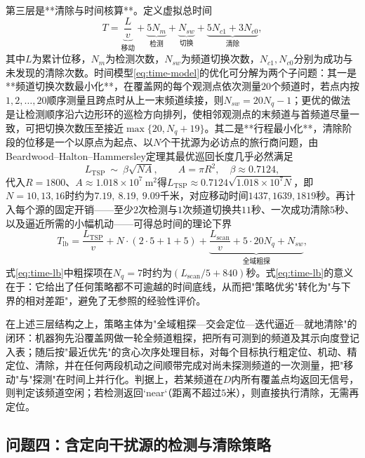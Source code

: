 \documentclass[12pt,a4paper]{ctexart}
\begin{document}
第三层是**清除与时间核算**。定义虚拟总时间
\begin{equation}
T=\underbrace{\frac{L}{v}}_{\text{移动}}+\underbrace{5N_m}_{\text{检测}}+\underbrace{N_{sw}}_{\text{切换}}+\underbrace{5N_{c1}+3N_{c0}}_{\text{清除}},
\label{eq:time-model}
\end{equation}
其中$L$为累计位移，$N_m$为检测次数，$N_{sw}$为频道切换次数，$N_{c1},N_{c0}$分别为成功与未发现的清除次数。时间模型\eqref{eq:time-model}的优化可分解为两个子问题：其一是**频道切换次数最小化**，在覆盖网的每个观测点依次测量$20$个频道时，若点内按$1,2,\dots,20$顺序测量且跨点时从上一末频道续接，则$N_{sw}=20N_q-1$；更优的做法是让检测顺序沿六边形环的巡检方向排列，使相邻观测点的末频道与首频道尽量一致，可把切换次数压至接近$\max\{20,N_q+19\}$。其二是**行程最小化**，清除阶段的位移是一个以原点为起点、以$N$个干扰源为必访点的旅行商问题，由Beardwood--Halton--Hammersley定理其最优巡回长度几乎必然满足
\begin{equation}
L_{\mathrm{TSP}}\ \sim\ \beta\sqrt{NA},\qquad A=\pi R^2,\quad \beta\approx0.7124,
\label{eq:bhh}
\end{equation}
代入$R=1800$、$A\approx1.018\times10^7\ \mathrm{m^2}$得$L_{\mathrm{TSP}}\approx0.7124\sqrt{1.018\times10^7 N}$，即$N=10,13,16$时约为$7.19,\ 8.19,\ 9.09$千米，对应移动时间$1437,1639,1819$秒。再计入每个源的固定开销——至少$2$次检测与$1$次频道切换共$11$秒、一次成功清除$5$秒、以及逼近所需的小幅机动——可得总时间的理论下界
\begin{equation}
T_{\mathrm{lb}}=\frac{L_{\mathrm{TSP}}}{v}+N\cdot(2\cdot5+1+5)+\underbrace{\frac{L_{\mathrm{scan}}}{v}+5\cdot20N_q+N_{sw}}_{\text{全域粗探}},
\label{eq:time-lb}
\end{equation}
式\eqref{eq:time-lb}中粗探项在$N_q=7$时约为$(L_{\mathrm{scan}}/5+840)$秒。式\eqref{eq:time-lb}的意义在于：它给出了任何策略都不可逾越的时间底线，从而把"策略优劣"转化为"与下界的相对差距"，避免了无参照的经验性评价。

在上述三层结构之上，策略主体为"全域粗探—交会定位—迭代逼近—就地清除"的闭环：机器狗先沿覆盖网做一轮全频道粗探，把所有可测到的频道及其示向度登记入表；随后按"最近优先"的贪心次序处理目标，对每个目标执行粗定位、机动、精定位、清除，并在任何两段机动之间顺带完成对尚未探测频道的一次测量，把"移动"与"探测"在时间上并行化。判据上，若某频道在$D$内所有覆盖点均返回无信号，则判定该频道空闲；若检测返回`near`（距离不超过$5$米），则直接执行清除，无需再定位。

\subsection{问题四：含定向干扰源的检测与清除策略}
\end{document}
